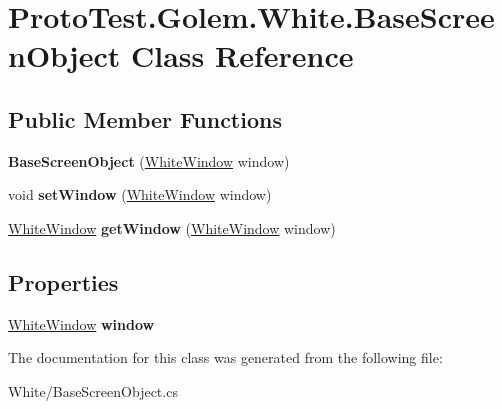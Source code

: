 \hypertarget{class_proto_test_1_1_golem_1_1_white_1_1_base_screen_object}{\section{Proto\-Test.\-Golem.\-White.\-Base\-Screen\-Object Class Reference}
\label{class_proto_test_1_1_golem_1_1_white_1_1_base_screen_object}
}
\subsection*{Public Member Functions}
\begin{DoxyCompactItemize}
\item 
\hypertarget{class_proto_test_1_1_golem_1_1_white_1_1_base_screen_object_a05f33b427ec081a7e86ff39e0060e1c2}{{\bfseries Base\-Screen\-Object} (\hyperlink{class_proto_test_1_1_golem_1_1_white_1_1_elements_1_1_white_window}{White\-Window} window)}\label{class_proto_test_1_1_golem_1_1_white_1_1_base_screen_object_a05f33b427ec081a7e86ff39e0060e1c2}

\item 
\hypertarget{class_proto_test_1_1_golem_1_1_white_1_1_base_screen_object_a054cdd3e8ba9d1ae441859bf7d7fdeb5}{void {\bfseries set\-Window} (\hyperlink{class_proto_test_1_1_golem_1_1_white_1_1_elements_1_1_white_window}{White\-Window} window)}\label{class_proto_test_1_1_golem_1_1_white_1_1_base_screen_object_a054cdd3e8ba9d1ae441859bf7d7fdeb5}

\item 
\hypertarget{class_proto_test_1_1_golem_1_1_white_1_1_base_screen_object_a359fd9f8a8ba951fbcc6df857fe80b06}{\hyperlink{class_proto_test_1_1_golem_1_1_white_1_1_elements_1_1_white_window}{White\-Window} {\bfseries get\-Window} (\hyperlink{class_proto_test_1_1_golem_1_1_white_1_1_elements_1_1_white_window}{White\-Window} window)}\label{class_proto_test_1_1_golem_1_1_white_1_1_base_screen_object_a359fd9f8a8ba951fbcc6df857fe80b06}

\end{DoxyCompactItemize}
\subsection*{Properties}
\begin{DoxyCompactItemize}
\item 
\hypertarget{class_proto_test_1_1_golem_1_1_white_1_1_base_screen_object_a840f9119609e9926f048b28a9e39a91e}{\hyperlink{class_proto_test_1_1_golem_1_1_white_1_1_elements_1_1_white_window}{White\-Window} {\bfseries window}}\label{class_proto_test_1_1_golem_1_1_white_1_1_base_screen_object_a840f9119609e9926f048b28a9e39a91e}

\end{DoxyCompactItemize}


The documentation for this class was generated from the following file\-:\begin{DoxyCompactItemize}
\item 
White/Base\-Screen\-Object.\-cs\end{DoxyCompactItemize}
